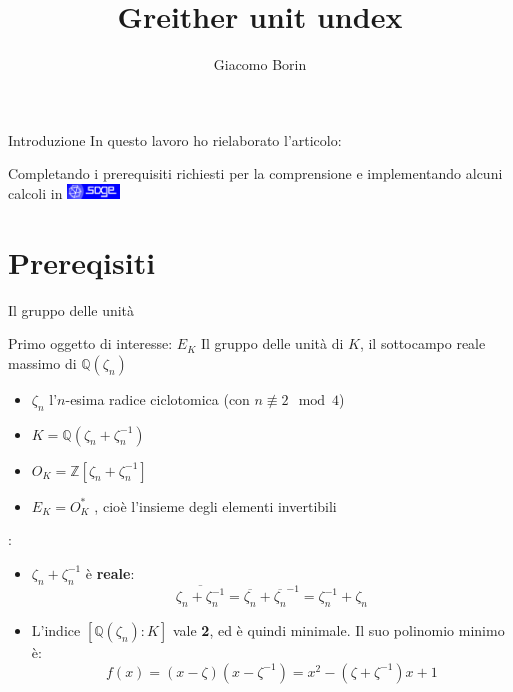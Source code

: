 \documentclass{beamer}
\title{Greither unit undex}
\author{Giacomo Borin}
\institute{Università di Trento}
\newcommand{\Z}{\mathbb{Z}}
\newcommand{\Q}{\mathbb{Q}}
\begin{document}
	\begin{frame}[plain]
	    \maketitle
	\end{frame}
	
	\begin{frame}{Introduzione}
		In questo lavoro ho rielaborato l'articolo: 
		\pause
		\begin{exampleblock}{}
		\end{exampleblock}	
		\pause
		Completando i prerequisiti richiesti per la comprensione e implementando alcuni calcoli in \href{https://www.sagemath.org}{\includegraphics[height= 11pt]{../images/sage.png} }
		
	\end{frame}
	\section{Prereqisiti}

	\begin{frame}{Il gruppo delle unità}
		\begin{block}{Primo oggetto di interesse: $ E_K $}
			Il gruppo delle unità di $ K $, il sottocampo reale massimo di $ \Q (\zeta_n )  $
		\end{block}
		\pause
		\begin{itemize}
			\item $ \zeta_n $  l'$ n $-esima radice ciclotomica (con $ n \not \equiv 2 \mod 4 $) \pause
			\item $ K = \Q (\zeta_n + \zeta_n^{-1})$ \pause
			\item $ O_K = \Z[\zeta_n + \zeta_n^{-1}] $ \pause
			\item $ E_K = O _K ^\ast$ , cioè l'insieme degli elementi invertibili 
		\end{itemize}
	\end{frame}
	
	\begin{frame}
		\proofname: 
		\newline
		\begin{itemize}
		\item $  \zeta_n + \zeta_n^{-1}  $ è \textbf{reale}:
		\[ \overline{\zeta_n + \zeta_n^{-1}} = \overline{\zeta_n} + \overline{\zeta_n}^{-1} = \zeta_n^{-1} + \zeta_n \] \pause
		\item L'indice $ [\Q(\zeta_n) : K] $ vale \textbf{2}, ed è quindi minimale. \pause 
		Il suo polinomio minimo è: 
		\[ f(x) = (x-\zeta)(x- \zeta^{-1}) = x^2 - (\zeta + \zeta ^{-1})x +1   \]
		\end{itemize}
	\end{frame}
	
\end{document}
